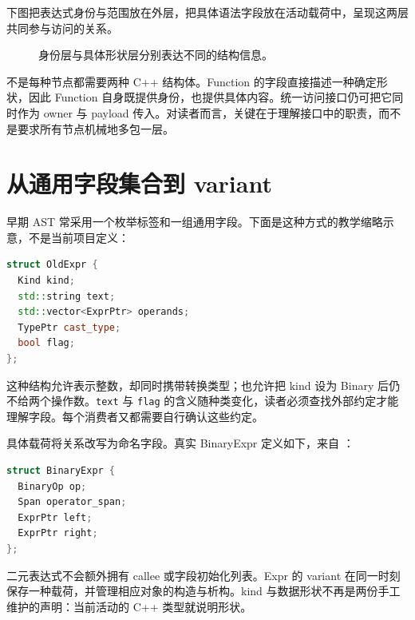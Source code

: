 下图把表达式身份与范围放在外层，把具体语法字段放在活动载荷中，呈现这两层共同参与访问的关系。
\begin{figure}[htbp]
\centering
{}
\caption{身份层与具体形状层分别表达不同的结构信息。}
\end{figure}
不是每种节点都需要两种 C++ 结构体。Function 的字段直接描述一种确定形状，因此 Function 自身既提供身份，也提供具体内容。统一访问接口仍可把它同时作为 owner 与 payload 传入。对读者而言，关键在于理解接口中的职责，而不是要求所有节点机械地多包一层。

\section{从通用字段集合到 variant}
早期 AST 常采用一个枚举标签和一组通用字段。下面是这种方式的教学缩略示意，不是当前项目定义：
\begin{lstlisting}[language=C++]
struct OldExpr {
  Kind kind;
  std::string text;
  std::vector<ExprPtr> operands;
  TypePtr cast_type;
  bool flag;
};
\end{lstlisting}
这种结构允许表示整数，却同时携带转换类型；也允许把 kind 设为 Binary 后仍不给两个操作数。\texttt{text} 与 \texttt{flag} 的含义随种类变化，读者必须查找外部约定才能理解字段。每个消费者又都需要自行确认这些约定。

具体载荷将关系改写为命名字段。真实 BinaryExpr 定义如下，来自 ：
\begin{lstlisting}[language=C++]
struct BinaryExpr {
  BinaryOp op;
  Span operator_span;
  ExprPtr left;
  ExprPtr right;
};
\end{lstlisting}
二元表达式不会额外拥有 callee 或字段初始化列表。Expr 的 variant 在同一时刻保存一种载荷，并管理相应对象的构造与析构。kind 与数据形状不再是两份手工维护的声明：当前活动的 C++ 类型就说明形状。

